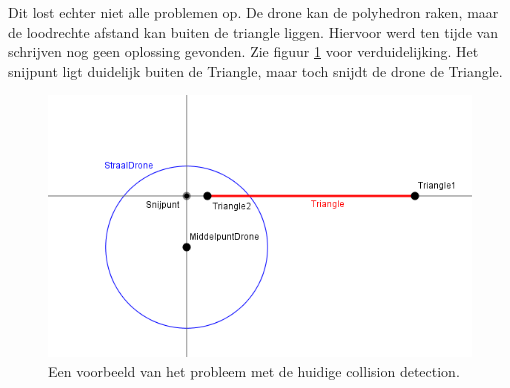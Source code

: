 \noindent
Dit lost echter niet alle problemen op. De drone kan de polyhedron raken, maar de loodrechte afstand kan buiten de triangle liggen. Hiervoor werd ten tijde van schrijven nog geen oplossing gevonden. Zie figuur \ref{fig:CollisionDetectionProbleem} voor verduidelijking. Het snijpunt ligt duidelijk buiten de Triangle, maar toch snijdt de drone de Triangle.
\begin{figure}[h]
	\includegraphics[width=1\textwidth]{CollisionDetectionProbleem.png}
	\caption{Een voorbeeld van het probleem met de huidige collision detection.\\ }
	\label{fig:CollisionDetectionProbleem}
\end{figure}